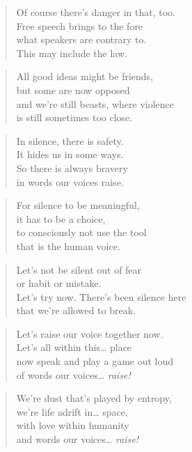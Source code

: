 \documentclass[10pt,a4paper]{article}
\begin{document}
\begin{paracol}{2}
\begin{verse}
Of course there’s danger in that, too.\\
Free speech brings to the fore\\
what speakers are contrary to.\\
This may include the law.
\end{verse}

\begin{verse}
All good ideas might be friends,\\
but some are now opposed\\
and we’re still beasts, where violence\\
is still sometimes too close.
\end{verse}

\begin{verse}
In silence, there is safety.\\
It hides us in some ways.\\
So there is always bravery\\
in words our voices raise.\\
\end{verse}

\begin{verse}
For silence to be meaningful,\\
it has to be a choice,\\
to consciously not use the tool\\
that is the human voice.
\end{verse}

\begin{verse}
Let’s not be silent out of fear\\
or habit or mistake.\\
Let’s try now. There’s been silence here\\
that we’re allowed to break.
\end{verse}

\begin{verse}
Let’s raise our voice together now.\\
Let’s all within this… place\\
now speak and play a game out loud\\
of words our voices… \emph{raise!}
\end{verse}

\begin{verse}
We’re dust that’s played by entropy,\\
we’re life adrift in… space,\\
with love within humanity\\
and words our voices… \emph{raise!}
\end{verse}


\end{paracol}
\end{document}

